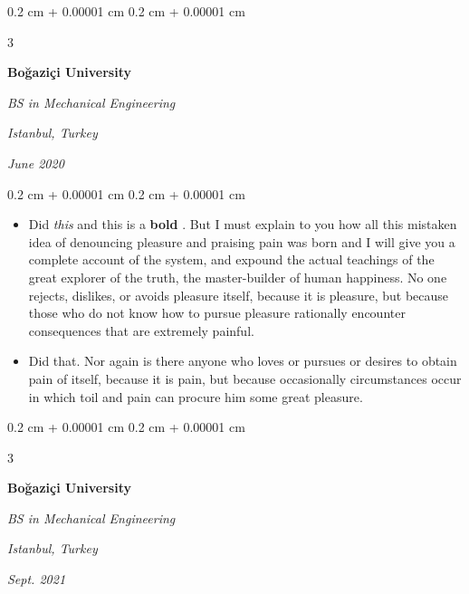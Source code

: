 \documentclass[10pt, letterpaper]{article}
\newenvironment{highlights}{
    \begin{itemize}[
        topsep=0.10 cm,
        parsep=0.10 cm,
        partopsep=0pt,
        itemsep=0pt,
        leftmargin=0.4 cm + 10pt + 0.6 cm
    ]
}{
    \end{itemize}
} %
\newenvironment{onecolentry}{
    \begin{adjustwidth}{
        0.2 cm + 0.00001 cm
    }{
        0.2 cm + 0.00001 cm
    }
}{
    \end{adjustwidth}
} %
\newenvironment{threecolentry}[3][]{
    \onecolentry
    \def\thirdColumn{#3}
    \setcolumnwidth{0.6 cm, \fill, 4.5 cm}
    \begin{paracol}{3}
    #2 \switchcolumn
}{
    \switchcolumn \raggedleft \thirdColumn
    \end{paracol}
    \endonecolentry
} %
\let\hrefWithoutArrow\href
\renewcommand{\href}[2]{\hrefWithoutArrow{#1}{\mbox{\ifthenelse{\equal{#2}{}}{ }{#2 }\raisebox{.15ex}{\footnotesize \faExternalLink*}}}}
\begin{document}
        \vspace{0.2 cm-3px}

        \begin{threecolentry}{
            \vspace*{\fill}
            \textbullet
            \vspace*{3px}
            \vspace*{\fill}
        }{
        \textit{Istanbul, Turkey}    
            
        \textit{June 2020}}
            \textbf{Boğaziçi University}

            \textit{BS in Mechanical Engineering}
        \end{threecolentry}

        \vspace{0.10 cm-3px}
        \begin{onecolentry}
            \begin{highlights}
                \item Did \textit{this} and this is a \textbf{bold} \href{https://example.com}{link}. But I must explain to you how all this mistaken idea of denouncing pleasure and praising pain was born and I will give you a complete account of the system, and expound the actual teachings of the great explorer of the truth, the master-builder of human happiness. No one rejects, dislikes, or avoids pleasure itself, because it is pleasure, but because those who do not know how to pursue pleasure rationally encounter consequences that are extremely painful.
                \item Did that. Nor again is there anyone who loves or pursues or desires to obtain pain of itself, because it is pain, but because occasionally circumstances occur in which toil and pain can procure him some great pleasure.
            \end{highlights}
        \end{onecolentry}


        \vspace{0.2 cm-3px}

        \begin{threecolentry}{
            \vspace*{\fill}
            \textbullet
            \vspace*{3px}
            \vspace*{\fill}
        }{
        \textit{Istanbul, Turkey}    
            
        \textit{Sept. 2021}}
            \textbf{Boğaziçi University}

            \textit{BS in Mechanical Engineering}
        \end{threecolentry}
\end{document}
